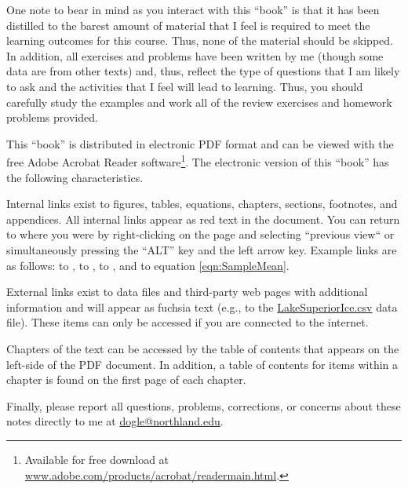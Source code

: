 One note to bear in mind as you interact with this ``book'' is that it has been distilled to the barest amount of material that I feel is required to meet the learning outcomes for this course.  Thus, none of the material should be skipped.  In addition, all exercises and problems have been written by me (though some data are from other texts) and, thus, reflect the type of questions that I am likely to ask and the activities that I feel will lead to learning.  Thus, you should carefully study the examples and work all of the review exercises and homework problems provided.

This ``book'' is distributed in electronic PDF format and can be viewed with the free Adobe Acrobat Reader software\footnote{Available for free download at \href{http://www.adobe.com/products/acrobat/readermain.html}{www.adobe.com/products/acrobat/readermain.html}.}.  The electronic version of this ``book'' has the following characteristics.

\begin{Itemize}
  \item Internal links exist to figures, tables, equations, chapters, sections, footnotes, and appendices.  All internal links appear as red text in the document.  You can return to where you were by right-clicking on the page and selecting ``previous view`` or simultaneously pressing the ``ALT'' key and the left arrow key.  Example links are as follows: to , to , to , and to equation \eqref{eqn:SampleMean}.
  \item External links exist to data files and third-party web pages with additional information and will appear as fuchsia text (e.g., to the \href{https://raw.githubusercontent.com/droglenc/NCData/master/LakeSuperiorIce.csv}{LakeSuperiorIce.csv} data file).  These items can only be accessed if you are connected to the internet.
  \item Chapters of the text can be accessed by the table of contents that appears on the left-side of the PDF document.  In addition, a table of contents for items within a chapter is found on the first page of each chapter.
\end{Itemize}

Finally, please report all questions, problems, corrections, or concerns about these notes directly to me at \href{mailto:dogle@northland.edu}{dogle@northland.edu}.


